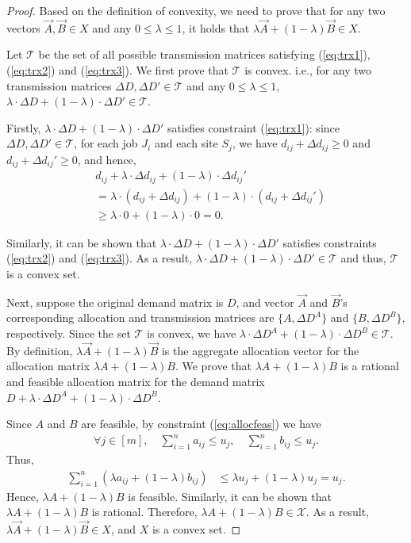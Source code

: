 \begin{proof}
Based on the definition of convexity, we need to prove that for any two vectors $\vec A, \vec B \in X$ and any $0 \leq \lambda \leq 1$, it holds that $\lambda \vec A + (1-\lambda) \vec B \in X$.

Let $\mathcal{T}$ be the set of all possible transmission matrices satisfying (\ref{eq:trx1}), (\ref{eq:trx2}) and (\ref{eq:trx3}). We first prove that $\mathcal{T}$ is convex. i.e., for any two transmission matrices $\Delta D,\Delta D' \in \mathcal{T}$ and any $0 \leq \lambda \leq 1$, $\lambda \cdot \Delta D + (1-\lambda) \cdot \Delta D' \in \mathcal{T}$.

Firstly, $\lambda \cdot \Delta D + (1-\lambda) \cdot \Delta D'$ satisfies constraint (\ref{eq:trx1}): since $\Delta D,\Delta D' \in \mathcal{T}$, for each job $J_i$ and each site $S_j$, we have $d_{ij} + \Delta d_{ij} \geq 0$ and $d_{ij} + \Delta d_{ij}' \geq 0$, and hence, 
\begin{align}
    \nonumber &d_{ij} + \lambda \cdot \Delta d_{ij} + (1-\lambda) \cdot \Delta d_{ij}'\\
    \nonumber &= \lambda \cdot (d_{ij} + \Delta d_{ij}) + (1-\lambda) \cdot (d_{ij} + \Delta d_{ij}')\\
    \nonumber &\geq \lambda\cdot 0+(1-\lambda)\cdot 0 =0. 
\end{align}

Similarly, it can be shown that $\lambda \cdot \Delta D + (1-\lambda) \cdot \Delta D'$ satisfies constraints (\ref{eq:trx2}) and (\ref{eq:trx3}). As a result, $\lambda \cdot \Delta D + (1-\lambda) \cdot \Delta D' \in \mathcal{T}$ and thus, $\mathcal{T}$ is a convex set.

Next, suppose the original demand matrix is $D$, and vector $\vec A$ and $\vec B$'s corresponding allocation and transmission matrices are $\{A, \Delta D^A\}$ and $\{B, \Delta D^B\}$, respectively. Since the set $\mathcal{T}$ is convex, we have $\lambda \cdot \Delta D^A + (1-\lambda) \cdot \Delta D^B \in \mathcal{T}$. By definition, $\lambda \vec A + (1-\lambda) \vec B$ is the aggregate allocation vector for the allocation matrix $\lambda A + (1-\lambda) B$. We prove that $\lambda A + (1-\lambda) B$ is a rational and feasible allocation matrix for the demand matrix $D + \lambda \cdot \Delta D^A + (1-\lambda) \cdot \Delta D^B$.

Since $A$ and $B$ are feasible, by constraint (\ref{eq:allocfeas}) we have
\begin{align}
    \forall j \in [m], \quad \nonumber\sum_{i=1}^n a_{ij} \leq u_j, \quad \nonumber\sum_{i=1}^n b_{ij} \leq u_j.
\end{align}
Thus,
\begin{align}
    \nonumber \sum_{i=1}^n\left(\lambda a_{ij} + (1-\lambda)b_{ij}\right) &\leq \lambda u_j+ (1-\lambda) u_j =u_j.
\end{align}
Hence, $\lambda A + (1-\lambda)B$ is feasible. Similarly, it can be shown that $\lambda A + (1-\lambda)B$ is rational. Therefore, $\lambda A + (1-\lambda)B \in \mathcal{X}$. As a result, $\lambda \vec A + (1-\lambda) \vec B \in X$, and $X$ is a convex set.
\end{proof}
